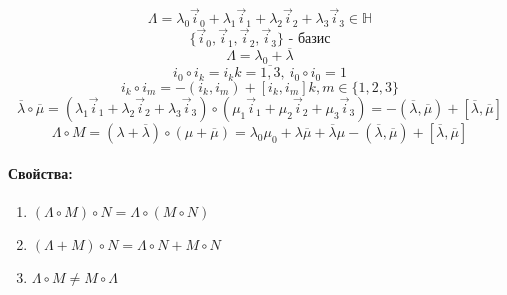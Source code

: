 \documentclass{article}
\begin{document}
  $$ \Lambda = \lambda_0 \vec{i}_0 + \lambda_1 \vec{i}_1 + \lambda_2 \vec{i}_2 + \lambda_3 \vec{i}_3 \in \mathbb{H} $$
  $$ \{\vec{i}_0, \vec{i}_1, \vec{i}_2, \vec{i}_3\} \text{ - базис} $$
  $$ \Lambda = \lambda_0 + \overline{\lambda} $$
  $$ i_0 \circ i_k = i_k k = \overline{1, 3},~ i_0 \circ i_0 = 1 $$
  $$ i_k \circ i_m = -(i_k, i_m) + [i_k, i_m] k, m \in \{1,2,3\} $$
  $$ \overline{\lambda} \circ \overline{\mu} = (\lambda_1 \vec{i}_1 + \lambda_2 \vec{i}_2 + \lambda_3 \vec{i}_3) \circ (\mu_1 \vec{i}_1 + \mu_2 \vec{i}_2 + \mu_3 \vec{i}_3) = -(\overline{\lambda}, \overline{\mu}) + [\overline{\lambda}, \overline{\mu}] $$
  $$ \Lambda \circ M = (\lambda + \overline{\lambda}) \circ (\mu + \overline{\mu}) = \lambda_0 \mu_0 + \lambda\overline{\mu} + \overline{\lambda}\mu - (\overline{\lambda}, \overline{\mu}) + [\overline{\lambda}, \overline{\mu}] $$
  \paragraph{Свойства:}
  \begin{enumerate}
    \item $(\Lambda \circ M) \circ N = \Lambda \circ (M \circ N)$
    \item $(\Lambda + M) \circ N = \Lambda \circ N + M \circ N $
    \item $\Lambda \circ M \neq M \circ \Lambda$
  \end{enumerate}
  
\end{document}
